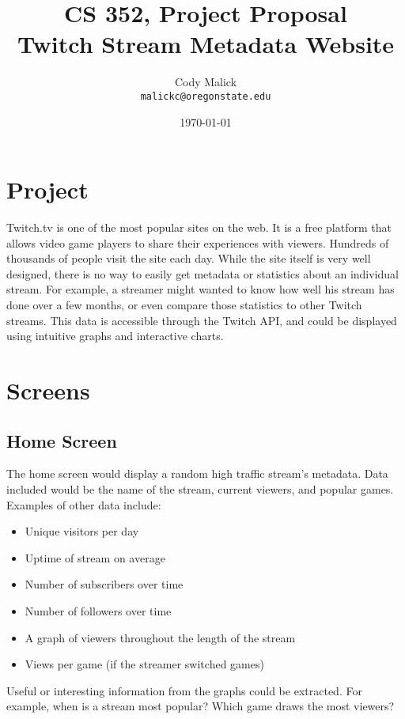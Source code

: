 \documentclass[10pt]{article}
\begin{document}
\title{CS 352, Project Proposal\\ Twitch Stream Metadata Website}
\author{Cody Malick\\
\texttt{malickc@oregonstate.edu}}
\date{\today}
\maketitle

\section*{Project}
Twitch.tv is one of the most popular sites on the web. It is a free platform
that allows video game players to share their experiences with viewers. Hundreds
of thousands of people visit the site each day. While the site itself is
very well designed, there is no way to easily get metadata or statistics about 
an individual stream. For example, a streamer might wanted to know how well his stream has
done over a few months, or even compare those statistics to other Twitch streams.
This data is accessible through the Twitch API, and could be displayed using 
intuitive graphs and interactive charts.

\section{Screens}
\subsection{Home Screen}
The home screen would display a random high traffic stream's metadata. Data
included would be the name of the stream, current viewers, and popular games.
Examples of other data include:
\begin{itemize}
	\item Unique visitors per day
	\item Uptime of stream on average
	\item Number of subscribers over time
	\item Number of followers over time
	\item A graph of viewers throughout the length of the stream
	\item Views per game (if the streamer switched games)
\end{itemize}

Useful or interesting information from the graphs could be extracted. For example,
when is a stream most popular? Which game draws the most viewers? 
\end{document}
